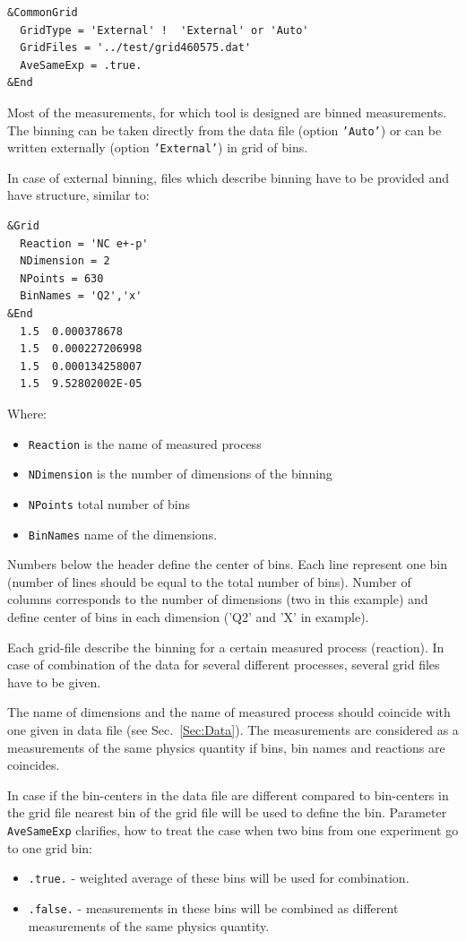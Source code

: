 \begin{verbatim}
&CommonGrid
  GridType = 'External' !  'External' or 'Auto'
  GridFiles = '../test/grid460575.dat'
  AveSameExp = .true.
&End
\end{verbatim}
Most of the measurements, for which tool is designed are binned measurements. The binning can be taken directly from the data file (option {\tt 'Auto'}) or can be written externally (option {\tt 'External'}) in grid of bins. 

In case of external binning, files which describe binning have to be provided and have structure, similar to:

\begin{verbatim}
&Grid
  Reaction = 'NC e+-p'
  NDimension = 2
  NPoints = 630
  BinNames = 'Q2','x'
&End
  1.5  0.000378678
  1.5  0.000227206998
  1.5  0.000134258007
  1.5  9.52802002E-05
\end{verbatim}
Where:
\begin{itemize}
\item {\tt Reaction} is the name of measured process
\item {\tt NDimension} is the number of dimensions of the binning
\item {\tt NPoints} total number of bins
\item {\tt BinNames} name of the dimensions.
\end{itemize}

Numbers below the header define the center of bins. Each line represent one bin (number of lines should be equal to the total number of bins). Number of columns corresponds to the number of dimensions (two in this example) and define center of bins in each dimension ('Q2' and 'X' in example).

Each grid-file describe the binning for a certain measured process (reaction). In case of combination of the data for several different processes, several grid files have to be given.

The name of dimensions and the name of measured process should coincide with one given in data file (see Sec.~\ref{Sec:Data}). The measurements are considered as a measurements of the same physics quantity if bins, bin names and reactions are coincides. 

In case if the bin-centers in the data file are different compared to bin-centers in the grid file nearest bin of the grid file will be used to define the bin. Parameter {\tt AveSameExp} clarifies, how to treat the case when two bins from one experiment go to one grid bin:
\begin{itemize}
\item {\tt .true.} - weighted average of these bins will be used for combination.
\item {\tt .false.} - measurements in these bins will be combined as different measurements of the same physics quantity.
\end{itemize}

